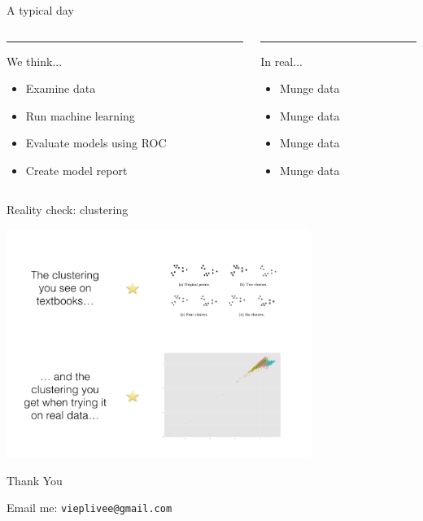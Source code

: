 \documentclass[10pt]{beamer}
\begin{document}
    \begin{frame}{A typical day}
        \begin{columns}[T] %
            \begin{column}{.48\textwidth}
                \color{blue}\rule{\linewidth}{4pt}
                We think...
                \begin{itemize}
                    \item Examine data
                    \item Run machine learning
                    \item Evaluate models using ROC
                    \item Create model report
                \end{itemize}                        
            \end{column}
        \hfill%
            \begin{column}{.48\textwidth}
                \color{red}\rule{\linewidth}{4pt}
                In real...
                \begin{itemize}
                    \item Munge data
                    \item Munge data
                    \item Munge data
                    \item Munge data
                \end{itemize}
            \end{column}
        \end{columns}
    \end{frame}
    
    \begin{frame}{Reality check: clustering}
        \begin{center}
        \includegraphics[width=280pt]{graphs/clustering_reality}
        \end{center}
    \end{frame}

    \begin{frame}{Thank You}
      \centerline{\large Email me: \texttt{vieplivee@gmail.com}}
    \end{frame}
\end{document}
